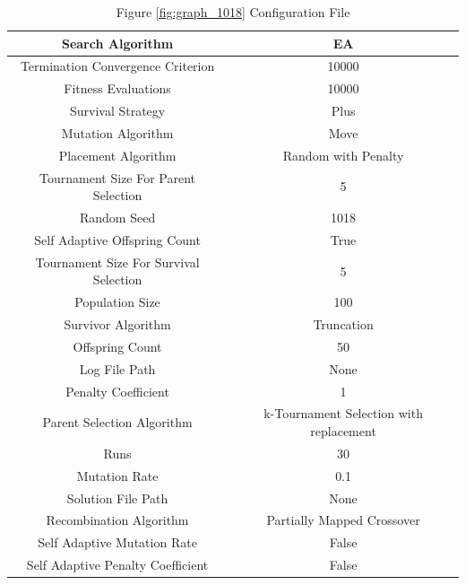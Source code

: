 \documentclass{standalone}
\begin{document}
\begin{table}[!htb]
	\centering
	\caption{Figure \ref{fig:graph_1018} Configuration File}
	\label{tab:graph_1018}
	\begin{tabular}{| c | c |}
		\hline
		Search Algorithm		& EA		 \\
		\hline
		Termination Convergence Criterion		& 10000		 \\
		\hline
		Fitness Evaluations		& 10000		 \\
		\hline
		Survival Strategy		& Plus		 \\
		\hline
		Mutation Algorithm		& Move		 \\
		\hline
		Placement Algorithm		& Random with Penalty		 \\
		\hline
		Tournament Size For Parent Selection		& 5		 \\
		\hline
		Random Seed		& 1018		 \\
		\hline
		Self Adaptive Offspring Count		& True		 \\
		\hline
		Tournament Size For Survival Selection		& 5		 \\
		\hline
		Population Size		& 100		 \\
		\hline
		Survivor Algorithm		& Truncation		 \\
		\hline
		Offspring Count		& 50		 \\
		\hline
		Log File Path		& None		 \\
		\hline
		Penalty Coefficient		& 1		 \\
		\hline
		Parent Selection Algorithm		& k-Tournament Selection with replacement		 \\
		\hline
		Runs		& 30		 \\
		\hline
		Mutation Rate		& 0.1		 \\
		\hline
		Solution File Path		& None		 \\
		\hline
		Recombination Algorithm		& Partially Mapped Crossover		 \\
		\hline
		Self Adaptive Mutation Rate		& False		 \\
		\hline
		Self Adaptive Penalty Coefficient		& False		 \\
		\hline
	\end{tabular}
\end{table}
\end{document}

